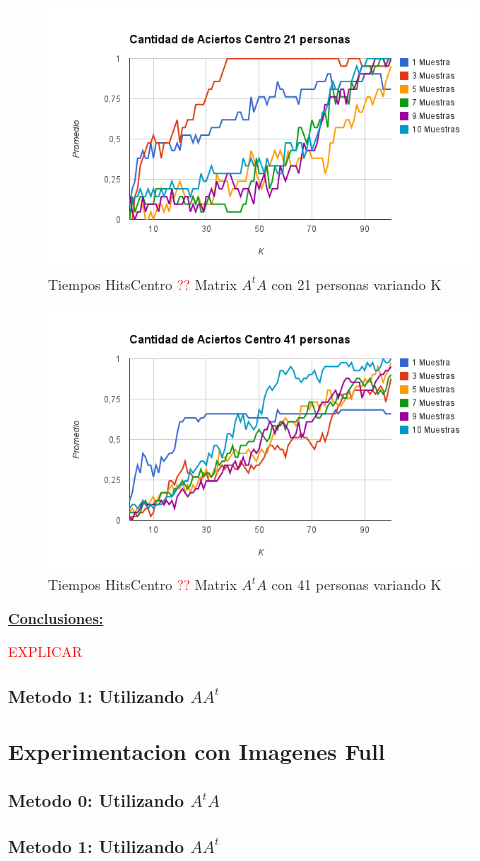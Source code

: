 \begin{figure}[H]
\includegraphics[width=1\textwidth]{img/image14.png}
     \caption{Tiempos HitsCentro \textcolor{red}{??} Matrix $A^tA$ con 21 personas variando K}
     \label{fig:figura1}
\end{figure}

\begin{figure}[H]
\includegraphics[width=1\textwidth]{img/image15.png}
     \caption{Tiempos HitsCentro \textcolor{red}{??} Matrix $A^tA$ con 41 personas variando K}
     \label{fig:figura1}
\end{figure}

\underline{\textbf{Conclusiones:}}

\textcolor{red}{EXPLICAR}

\subsubsection{Metodo 1: Utilizando $AA^t$}
\subsection{Experimentacion con Imagenes Full}
\subsubsection{Metodo 0: Utilizando $A^tA$}
\subsubsection{Metodo 1: Utilizando $AA^t$}